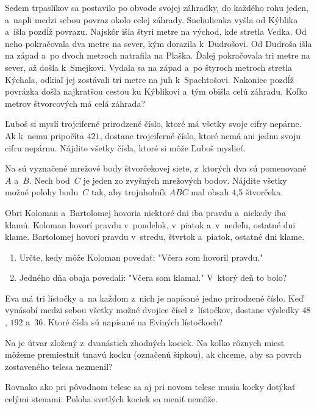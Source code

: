 {%
Sedem trpaslíkov sa postavilo po obvode svojej záhradky, do každého rohu jeden,
a~napli medzi sebou povraz okolo celej záhrady. Snehulienka vyšla od Kýblika
a~išla pozdĺž povrazu. Najskôr išla štyri metre na východ, kde stretla Vedka.
Od neho pokračovala dva metre na sever, kým dorazila k~Dudrošovi. Od
Dudroša išla na západ a~po dvoch metroch natrafila na Plaška. Ďalej
pokračovala tri metre na sever, až došla k~Smejkovi. Vydala sa na západ
a~po štyroch metroch stretla Kýchala, odkiaľ jej zostávali tri metre na juh
k~Spachtošovi. Nakoniec pozdĺž povrázka došla najkratšou cestou ku Kýblikovi
a~tým obišla celú záhradu. Koľko metrov štvorcových má celá záhrada?
}

{%
Ľuboš si myslí trojciferné prirodzené číslo, ktoré má všetky svoje cifry
nepárne. Ak k~nemu pripočíta $421$, dostane trojciferné číslo, ktoré nemá ani
jednu svoju cifru nepárnu. Nájdite všetky čísla, ktoré si môže Ľuboš myslieť.}

{%
Na \obr{} sú vyznačené mrežové body štvorčekovej siete,
z~ktorých dva sú pomenované $A$ a~$B$.
Nech bod~$C$ je jeden zo zvyšných mrežových bodov.
Nájdite všetky možné polohy bodu~$C$ tak, aby trojuholník $ABC$ mal obsah
4{,}5 štvorčeka.
%
}

{%
Obri Koloman a~Bartolomej hovoria niektoré dni iba pravdu a~niekedy iba klamú.
Koloman hovorí pravdu v~pondelok, v~piatok a~v~nedeľu, ostatné dni klame.
Bartolomej hovorí pravdu v~stredu, štvrtok a~piatok, ostatné dni klame.
\begin{enumerate}
  \item Určte, kedy môže Koloman povedať: "Včera som hovoril pravdu."
  \item Jedného dňa obaja povedali: "Včera som klamal."
    V~ktorý deň to bolo?
\end{enumerate}
}

{%
Eva má tri lístočky a~na každom z~nich je napísané jedno prirodzené číslo.
Keď vynásobí medzi sebou všetky možné dvojice čísel z~lístočkov, dostane výsledky $48$, $192$ a~$36$.
Ktoré čísla sú napísané na Eviných lístočkoch?}

{%
Na \obr{} je útvar zložený z~dvanástich zhodných kociek.
Na koľko rôznych miest môžeme premiestniť tmavú kocku (označenú šípkou), ak chceme, aby sa
povrch zostaveného telesa nezmenil?
%

\noindent
Rovnako ako pri pôvodnom telese sa aj pri novom telese musia kocky dotýkať celými
stenami. Poloha svetlých kociek sa meniť nemôže.
}

